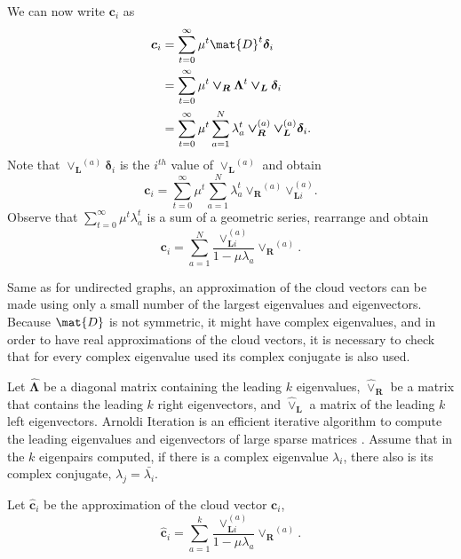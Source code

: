 \documentclass[12pt]{report}
\newcommand*\conj[1]{\bar{#1}}
\begin{document}
We can now write $\bm{c}_i$ as
\begin{align}
  \bm{c}_i &= \sum_{t=0}^\infty \mu^t \mat{D}^t \bm{\delta}_i \\
   &= \sum_{t=0}^\infty \mu^t \bm{\vee_R} \bm{\Lambda}^t \bm{\vee_L}
      \bm{\delta}_i \\
   &= \sum_{t=0}^\infty \mu^t \sum_{a=1}^N \lambda_a^t \bm{\vee_R}^{(a)}
      \bm{\vee_L}^{(a)} \bm{\delta}_i.
\end{align}
Note that $\bm{\vee_L}^{(a)} \bm{\delta}_i$ is the $i^{th}$ value of
$\bm{\vee_L}^{(a)}$ and obtain
\begin{equation}
  \bm{c}_i = \sum_{t=0}^\infty \mu^t \sum_{a=1}^N \lambda_a^t \bm{\vee_R}^{(a)}
     \bm{\vee}_{\bm{L}i}^{(a)}.
\end{equation}
Observe that $\sum_{t=0}^\infty \mu^t \lambda_a^t$ is a sum of a geometric
series, rearrange and obtain
\begin{equation}
  \bm{c}_i = \sum_{a=1}^N \frac{\bm{\vee}_{\bm{L}i}^{(a)}}
             {1 - \mu \lambda_a} \bm{\vee_R}^{(a)}.
\end{equation}

Same as for undirected graphs, an approximation of the cloud vectors can be made
using only a small number of the largest eigenvalues and eigenvectors. Because
$\mat{D}$ is not symmetric, it might have complex eigenvalues, and in order to
have real approximations of the cloud vectors, it is necessary to check that for
every complex eigenvalue used its complex conjugate is also used.


Let $\bm{\hat{\Lambda}}$ be a diagonal matrix containing the leading $k$
eigenvalues, $\bm{\hat{\vee}_R}$ be a matrix that contains the leading $k$ right
eigenvectors, and $\bm{\hat{\vee}_L}$ a matrix of the leading $k$ left
eigenvectors. Arnoldi Iteration is an efficient iterative algorithm to compute
the leading eigenvalues and eigenvectors of large sparse matrices
\cite{lehoucq1996deflation}. Assume that in the $k$ eigenpairs computed, if
there is a complex eigenvalue $\lambda_i$, there also is its complex conjugate,
$\lambda_j = \conj{\lambda_i}$.


Let $\bm{\hat{c}}_i$ be the approximation of the cloud vector $\bm{c}_i$,
\begin{equation}
  \label{eq:directed-hat-ci}
  \bm{\hat{c}}_i = \sum_{a=1}^k \frac{\bm{\vee}_{\bm{L}i}^{(a)}}
             {1 - \mu \lambda_a} \bm{\vee_R}^{(a)}.
\end{equation}
\end{document}
